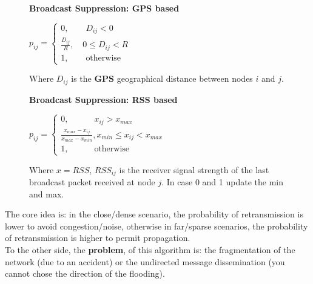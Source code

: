 \begin{figure}[h]
    \centering
    \begin{minipage}[t]{0.45\textwidth}
        \centering
        \textbf{Broadcast Suppression: GPS based} \\
        \begin{center}
            \begin{math}
                p_{ij} = 
                \begin{cases}
                    0, \qquad D_{ij} < 0 \\
                    \frac{D_{ij}}{R}, \quad 0 \leq D_{ij} < R \\
                    1, \qquad \text{otherwise}
                \end{cases}
            \end{math}
        \end{center}
        Where $D_{ij}$ is the \textbf{GPS} geographical distance between nodes $i$ and $j$.
    \end{minipage}
    \begin{minipage}[t]{0.45\textwidth}
        \centering
        \textbf{Broadcast Suppression: RSS based} \\
        \begin{center}
            \begin{math}
                p_{ij} = 
                \begin{cases}
                    0, \qquad \quad x_{ij} > x_{max} \\
                    \frac{x_{max} - x_{ij}}{x_{max} - x_{min}}, x_{min} \leq x_{ij} < x_{max} \\
                    1, \qquad \quad \text{otherwise}
                \end{cases}
            \end{math}
        \end{center}
        Where $x = RSS$, $RSS_{ij}$ is the receiver signal strength of the last broadcast packet received at node $j$. In case 0 and 1 update the min and max.
    \end{minipage}
\end{figure}
The core idea is: in the close/dense scenario, the probability of retransmission is lower to avoid congestion/noise, otherwise in far/sparse scenarios, the probability of retransmission is higher to permit propagation. \\
To the other side, the \textbf{problem}, of this algorithm is: the fragmentation of the network (due to an accident) or the undirected message dissemination (you cannot chose the direction of the flooding).

